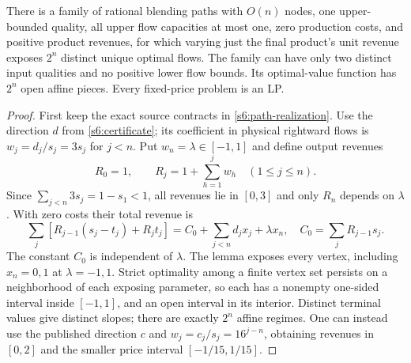 \begin{theorem}\label{s6:price-response}
There is a family of rational blending paths with $O(n)$ nodes, one
upper-bounded quality, all upper flow capacities at most one, zero
production costs, and positive product revenues, for which varying just
the final product's unit revenue exposes $2^n$ distinct unique optimal
flows. The family can have only two distinct input qualities and no
positive lower flow bounds. Its optimal-value function has $2^n$
open affine pieces. Every fixed-price problem is an LP.
\end{theorem}
\begin{proof}
First keep the exact source contracts in \cref{s6:path-realization}.
Use the direction $d$ from \cref{s6:certificate}; its coefficient in
physical rightward flows is $w_j=d_j/s_j=3s_j$ for $j<n$.
Put $w_n=\lambda\in[-1,1]$ and define output revenues
\[
 R_0=1,\qquad R_j=1+\sum_{h=1}^j w_h\quad(1\le j\le n).
\]
Since $\sum_{j<n}3s_j=1-s_1<1$, all revenues lie in $[0,3]$ and only
$R_n$ depends on $\lambda$. With zero costs their total revenue is
\begin{equation}
 \sum_j[R_{j-1}(s_j-t_j)+R_jt_j]
 =C_0+\sum_{j<n}d_jx_j+\lambda x_n,
 \quad C_0=\sum_jR_{j-1}s_j.\label{s6:price-identity}
\end{equation}
The constant $C_0$ is independent of $\lambda$. The lemma exposes every
vertex, including $x_n=0,1$ at $\lambda=-1,1$. Strict optimality among a
finite vertex set persists on a neighborhood of each exposing parameter,
so each has a nonempty one-sided interval inside $[-1,1]$, and an open
interval in its interior. Distinct terminal values give distinct slopes;
there are exactly $2^n$ affine regimes. One can instead use the published
direction $c$ and $w_j=c_j/s_j=16^{j-n}$, obtaining revenues in $[0,2]$
and the smaller price interval $[-1/15,1/15]$.


\end{proof}
